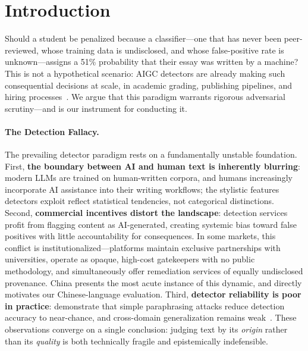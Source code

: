 \section{Introduction}
\label{sec:intro}

Should a student be penalized because a classifier---one that has
never been peer-reviewed, whose training data is undisclosed, and
whose false-positive rate is unknown---assigns a 51\% probability
that their essay was written by a machine?
This is not a hypothetical scenario: AIGC detectors are already
making such consequential decisions at scale, in academic grading,
publishing pipelines, and hiring processes~\citep{he2023mgtbench,
yang2024survey}.
We argue that this paradigm warrants rigorous adversarial
scrutiny---and \styleshield{} is our instrument for conducting it.

\paragraph{The Detection Fallacy.}
The prevailing detector paradigm rests on a fundamentally unstable
foundation.
First, \textbf{the boundary between AI and human text is inherently
blurring}: modern LLMs are trained on human-written corpora, and
humans increasingly incorporate AI assistance into their writing
workflows; the stylistic features detectors exploit reflect
statistical tendencies, not categorical distinctions.
Second, \textbf{commercial incentives distort the landscape}:
detection services profit from flagging content as AI-generated,
creating systemic bias toward false positives with little
accountability for consequences.
In some markets, this conflict is institutionalized---platforms
maintain exclusive partnerships with universities, operate as opaque,
high-cost gatekeepers with no public methodology, and simultaneously
offer remediation services of equally undisclosed provenance.
China presents the most acute instance of this dynamic, and directly
motivates our Chinese-language evaluation.
Third, \textbf{detector reliability is poor in practice}:
\citet{sadasivan2023aigenerated} demonstrate that simple paraphrasing
attacks reduce detection accuracy to near-chance, and cross-domain
generalization remains weak~\citep{he2023mgtbench}.
These observations converge on a single conclusion: judging text by
its \emph{origin} rather than its \emph{quality} is both technically
fragile and epistemically indefensible.

